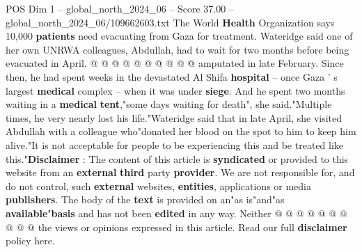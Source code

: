 \begin{textsample}{POS Dim 1 – global\_north\_2024\_06 – Score 37.00 – global\_north\_2024\_06/109662603.txt}
The World \textbf{Health} Organization says 10,000 \textbf{patients} need evacuating from Gaza for treatment.
Wateridge said one of her own UNRWA colleagues, Abdullah, had to wait for two months before being evacuated in April. @ @ @ @ @ @ @ @ @ @ amputated in late February.
Since then, he had spent weeks in the devastated Al Shifa \textbf{hospital} -- once Gaza ' s largest \textbf{medical} complex -- when it was under \textbf{siege}.
And he spent two months waiting in a \textbf{medical} \textbf{tent},"some days waiting for death", she said."Multiple times, he very nearly lost his life."Wateridge said that in late April, she visited Abdullah with a colleague who"donated her blood on the spot to him to keep him alive."It is not acceptable for people to be experiencing this and be treated like this."\textbf{Disclaimer} : The content of this article is \textbf{syndicated} or provided to this website from an \textbf{external} \textbf{third} party \textbf{provider}.
We are not responsible for, and do not control, such \textbf{external} websites, \textbf{entities}, applications or media \textbf{publishers}.
The body of the \textbf{text} is provided on an"as is"and"as \textbf{available}"\textbf{basis} and has not been \textbf{edited} in any way.
Neither @ @ @ @ @ @ @ @ @ @ the views or opinions expressed in this article.
Read our full \textbf{disclaimer} policy here.

\end{textsample}
